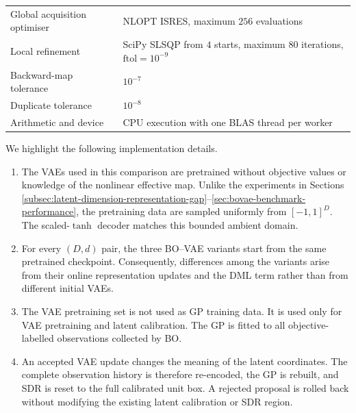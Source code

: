 \documentclass[pdflatex,sn-mathphys-num]{sn-jnl}%
\theoremstyle{thmstyleone}%
\theoremstyle{thmstyletwo}%
\theoremstyle{thmstylethree}%
\begin{document}
\begin{appendices}
\begin{table}[h]
\begin{tabularx}{\linewidth}{@{}l Y@{}}
Global acquisition optimiser
& NLOPT ISRES, maximum $256$ evaluations \\

Local refinement
& SciPy SLSQP from $4$ starts, maximum $80$ iterations,
  $\mathrm{ftol}=10^{-9}$ \\

Backward-map tolerance
& $10^{-7}$ \\

Duplicate tolerance
& $10^{-8}$ \\

Arithmetic and device
& CPU execution with one BLAS thread per worker \\
\bottomrule
\end{tabularx}
\end{table}

We highlight the following implementation details.

\begin{enumerate}
    \item The VAEs used in this comparison are pretrained without objective values or knowledge of the nonlinear effective map. Unlike the experiments in Sections \ref{subsec:latent-dimension-representation-gap}--\ref{sec:bovae-benchmark-performance}, the pretraining data are sampled uniformly from $[-1,1]^D$. The scaled-$\tanh$ decoder matches this bounded ambient domain.

    \item For every $(D,d)$ pair, the three BO--VAE variants start from the same pretrained checkpoint. Consequently, differences
    among the variants arise from their online representation updates and the DML term rather than from different initial VAEs.

    \item The VAE pretraining set is not used as GP training data. It is used only for VAE pretraining and latent calibration. The GP is fitted to all objective-labelled observations collected by BO.

    \item An accepted VAE update changes the meaning of the latent coordinates. The complete observation history is therefore re-encoded, the GP is rebuilt, and SDR is reset to the full calibrated unit box. A rejected proposal is rolled back without modifying the existing latent calibration or SDR region.
\end{enumerate}

\FloatBarrier


\end{appendices}
\end{document}
